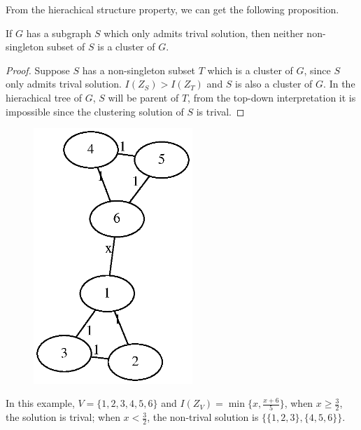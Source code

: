 \documentclass{article}
\begin{document}
From the hierachical structure property, we can get the following proposition.

\begin{proposition}
If $G$ has a subgraph $S$ which only admits trival solution, then neither non-singleton subset of $S$ is a cluster of $G$. 
\end{proposition}

\begin{proof}
Suppose  $S$ has a non-singleton subset $T$ which is a cluster of $G$, since $S$ only admits trival solution. $I(Z_S) > I(Z_T)$ and $S$ is also a cluster of $G$. In the hierachical tree of $G$, $S$ will be parent of $T$, from the top-down interpretation it is impossible since the clustering solution of $S$ is trival.
\end{proof}
\begin{example}
\begin{figure}[!ht]
\includegraphics[width=6cm]{sample/8point.eps}
\end{figure}
In this example, $V=\{1,2,3,4,5,6\}$ and $I(Z_V) = \min\{x,\frac{x+6}{5}\}$, when $x\geq \frac{3}{2}$, the solution is trival; when $ x< \frac{3}{2}$, the non-trival solution is $\{\{1,2,3\},\{4,5,6\}\}$.
\end{example}
\end{document}
